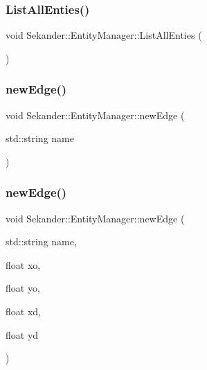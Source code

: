 \subsubsection{\texorpdfstring{List\+All\+Enties()}{ListAllEnties()}}
{\footnotesize\ttfamily void Sekander\+::\+Entity\+Manager\+::\+List\+All\+Enties (\begin{DoxyParamCaption}{ }\end{DoxyParamCaption})}

\mbox{\label{classSekander_1_1EntityManager_ab5c80c9646fea25cb0ab110a4ac51d38}} 
\subsubsection{\texorpdfstring{new\+Edge()}{newEdge()}\hspace{0.1cm}{\footnotesize\ttfamily [1/2]}}
{\footnotesize\ttfamily void Sekander\+::\+Entity\+Manager\+::new\+Edge (\begin{DoxyParamCaption}\item[{std\+::string}]{name }\end{DoxyParamCaption})}

\mbox{\label{classSekander_1_1EntityManager_a0debb38e1fb1e88d3d4e5af522e80b90}} 
\subsubsection{\texorpdfstring{new\+Edge()}{newEdge()}\hspace{0.1cm}{\footnotesize\ttfamily [2/2]}}
{\footnotesize\ttfamily void Sekander\+::\+Entity\+Manager\+::new\+Edge (\begin{DoxyParamCaption}\item[{std\+::string}]{name,  }\item[{float}]{xo,  }\item[{float}]{yo,  }\item[{float}]{xd,  }\item[{float}]{yd }\end{DoxyParamCaption})}


